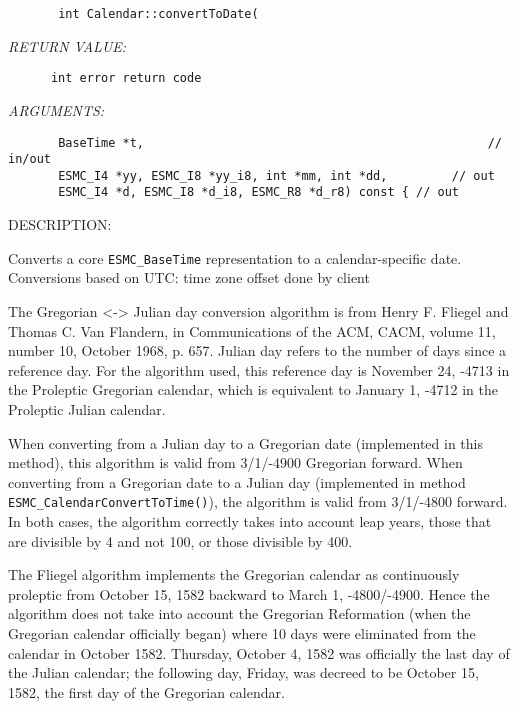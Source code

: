  
\begin{verbatim}       int Calendar::convertToDate(\end{verbatim}{\em RETURN VALUE:}
\begin{verbatim}      int error return code\end{verbatim}{\em ARGUMENTS:}
\begin{verbatim}       BaseTime *t,                                                // in/out
       ESMC_I4 *yy, ESMC_I8 *yy_i8, int *mm, int *dd,         // out
       ESMC_I4 *d, ESMC_I8 *d_i8, ESMC_R8 *d_r8) const { // out\end{verbatim}
{\sf DESCRIPTION:\\ }


       Converts a core {\tt ESMC\_BaseTime} representation to a
       calendar-specific date. Conversions based on UTC: time zone offset
       done by client
  
       The Gregorian <-> Julian day conversion algorithm is from
       Henry F. Fliegel and Thomas C. Van Flandern, in Communications of
       the ACM, CACM, volume 11, number 10, October 1968, p. 657.
       Julian day refers to the number of days since a reference day.
       For the algorithm used, this reference day is November 24, -4713
       in the Proleptic Gregorian calendar, which is equivalent to
       January 1, -4712 in the Proleptic Julian calendar.
   
       When converting from a Julian day to a Gregorian date (implemented
       in this method), this algorithm is valid from 3/1/-4900 Gregorian
       forward.  When converting from a Gregorian date to a Julian day
       (implemented in method {\tt ESMC\_CalendarConvertToTime()}), the
       algorithm is valid from 3/1/-4800 forward.  In both cases, the
       algorithm correctly takes into account leap years, those that are
       divisible by 4 and not 100, or those divisible by 400.
  
       The Fliegel algorithm implements the Gregorian calendar as continuously
       proleptic from October 15, 1582 backward to March 1, -4800/-4900.
       Hence the algorithm does not take into account the Gregorian Reformation
       (when the Gregorian calendar officially began) where 10 days were
       eliminated from the calendar in October 1582.  Thursday, October 4, 1582
       was officially the last day of the Julian calendar; the following day,
       Friday, was decreed to be October 15, 1582, the first day of the
       Gregorian calendar.
  
